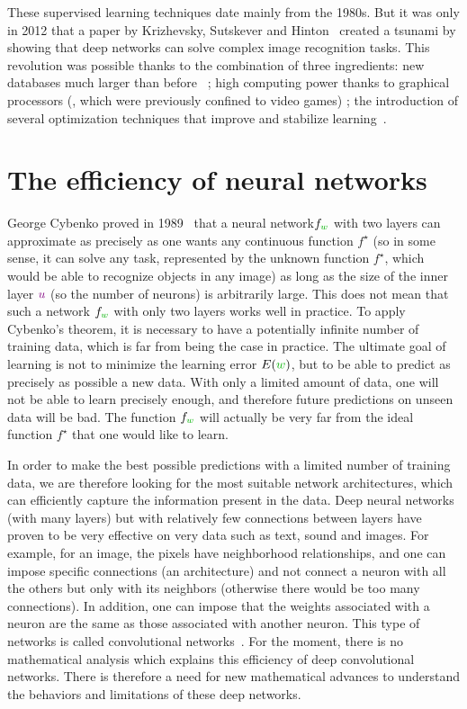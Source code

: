 These supervised learning techniques date mainly from the 1980s. But it was only in 2012 that a paper by Krizhevsky, Sutskever and Hinton~\cite{krizhevsky2012imagenet} created a tsunami by showing that deep networks can solve complex image recognition tasks.
%
This revolution was possible thanks to the combination of three ingredients: new databases much larger than before~\cite{deng2009imagenet} ; high computing power thanks to graphical processors (, which were previously confined to video games) ; the introduction of several optimization techniques that improve and stabilize learning~\cite{srivastava2014dropout}. 


\section{The efficiency of neural networks}

George Cybenko proved in 1989~\cite{cybenko1989approximation} that a neural network$f_{\mygreen{w}}$ with two layers can approximate as precisely as one wants any continuous function $f^\star$ (so in some sense, it can  solve any task, represented by the unknown function $f^\star$, which would be able to recognize objects in any image) as long as the size of the inner layer ${\color[rgb]{.5,0,.5} u}$ (so the number of neurons) is arbitrarily large.
%
This does not mean that such a network $f_{\mygreen{w}}$ with only two layers works well in practice. To apply Cybenko's theorem, it is necessary to have a potentially infinite number of training data, which is far from being the case in practice. 
%
The ultimate goal of learning is not to minimize the learning error $E(\mygreen{w})$, but to be able to predict as precisely as possible a new data. With only a limited amount of data, one will not be able to learn precisely enough, and therefore future predictions on unseen data will be bad. The function $f_{\mygreen{w}}$ will actually be very far from the ideal function $f^\star$ that one would like to learn. 

In order to make the best possible predictions with a limited number of training data, we are therefore looking for the most suitable network architectures, which can efficiently capture the information present in the data.
%
Deep neural networks (with many layers) but with relatively few connections between layers have proven to be very effective on very  data such as text, sound and images.
%
For example, for an image, the pixels have neighborhood relationships, and one can impose specific connections (an architecture) and not connect a neuron with all the others but only with its neighbors (otherwise there would be too many connections). In addition, one can impose that the weights associated with a neuron are the same as those associated with another neuron. This type of networks is called convolutional networks~\cite{lecun1998gradient}.
%
For the moment, there is no mathematical analysis which explains this efficiency of deep convolutional networks. There is therefore a need for new mathematical advances to understand the behaviors and limitations of these deep networks.


